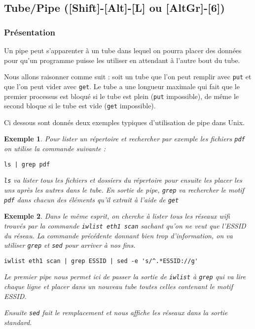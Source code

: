 \documentclass[12pt,a4paper]{report}
\newtheorem*{ex}{Exemple}
\begin{document}
\subsection{Tube/Pipe ([Shift]-[Alt]-[L] ou [AltGr]-[6])}
\label{sec:tube}

\subsubsection{Présentation}

Un pipe peut s'apparenter à un tube dans lequel on pourra placer des données pour qu'un programme puisse les utiliser en attendant à l'autre bout du tube.

Nous allons raisonner comme suit : soit un tube que l'on peut remplir avec \verb?put? et que l'on peut vider avec \verb?get?. Le tube a une longueur maximale qui fait que le premier processus est bloqué si le tube est plein (\verb?put? impossible), de même le second bloque si le tube est vide (\verb?get? impossible).

Ci dessous sont donnés deux exemples typiques d'utilisation de pipe dans Unix.

\begin{ex}
Pour lister un répertoire et rechercher par exemple les fichiers \texttt{pdf} on utilise la commande suivante :
\begin{verbatim}
ls | grep pdf
\end{verbatim}
\verb?ls? va lister tous les fichiers et dossiers du répertoire pour ensuite les placer les uns après les autres dans le tube. En sortie de pipe, \verb?grep? va rechercher le motif \texttt{pdf} dans chacun des éléments qu'il extrait à l'aide de \verb?get?
\end{ex}

\begin{ex}
Dans le même esprit, on cherche à lister tous les réseaux wifi trouvés par la commande \verb?iwlist eth1 scan? sachant qu'on ne veut que l'ESSID du réseau. La commande précédente donnant bien trop d'information, on va utiliser \verb?grep? et \verb?sed? pour arriver à nos fins.
\begin{verbatim}
iwlist eth1 scan | grep ESSID | sed -e 's/^.*ESSID://g' 
\end{verbatim}
Le premier pipe nous permet ici de passer la sortie de \verb?iwlist? à \verb?grep? qui va lire chaque ligne et placer dans un nouveau tube toutes celles contenant le motif ESSID.

Ensuite \verb?sed? fait le remplacement et nous affiche les réseaux dans la sortie standard.
\end{ex}
\end{document}
